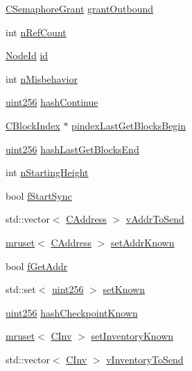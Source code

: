 \begin{DoxyCompactItemize}
\hyperlink{class_c_semaphore_grant}{C\+Semaphore\+Grant} \hyperlink{class_c_node_a4bb25f8bdeeaff5e8cb08abc97bbc44d}{grant\+Outbound}
\item 
int \hyperlink{class_c_node_a01f8cac776bef676651f9b8f3f80ae98}{n\+Ref\+Count}
\item 
\hyperlink{net_8h_a954d746a58632565552615fd0a4ee660}{Node\+Id} \hyperlink{class_c_node_af99591c635f495fc1e6c14745a2a4203}{id}
\item 
int \hyperlink{class_c_node_a442ac1857129bccaea4642d23d94ee58}{n\+Misbehavior}
\item 
\hyperlink{classuint256}{uint256} \hyperlink{class_c_node_a1a1c0d94de0197c5c4abf5a8d13364f3}{hash\+Continue}
\item 
\hyperlink{class_c_block_index}{C\+Block\+Index} $\ast$ \hyperlink{class_c_node_ac655c80f7fbef266417985776043785b}{pindex\+Last\+Get\+Blocks\+Begin}
\item 
\hyperlink{classuint256}{uint256} \hyperlink{class_c_node_a00f1eb04110387df966dd9c3ff3c53fb}{hash\+Last\+Get\+Blocks\+End}
\item 
int \hyperlink{class_c_node_a597b41bd64e2ac9391b7211e65aeb52a}{n\+Starting\+Height}
\item 
bool \hyperlink{class_c_node_a4009c240ccb6d085ae57e8cf4d4c2cb6}{f\+Start\+Sync}
\item 
std\+::vector$<$ \hyperlink{class_c_address}{C\+Address} $>$ \hyperlink{class_c_node_a9b2d9b9182ff111c79f704594c4aa2e1}{v\+Addr\+To\+Send}
\item 
\hyperlink{classmruset}{mruset}$<$ \hyperlink{class_c_address}{C\+Address} $>$ \hyperlink{class_c_node_ac21266ce880bd36b98ba7cfcc447a30f}{set\+Addr\+Known}
\item 
bool \hyperlink{class_c_node_a3da9c559959e182aff8439cd004ff624}{f\+Get\+Addr}
\item 
std\+::set$<$ \hyperlink{classuint256}{uint256} $>$ \hyperlink{class_c_node_ab1b30fa8e48005752f6b0bcf43eca478}{set\+Known}
\item 
\hyperlink{classuint256}{uint256} \hyperlink{class_c_node_af1b7e1316a44a8ed4995413366ed6b8a}{hash\+Checkpoint\+Known}
\item 
\hyperlink{classmruset}{mruset}$<$ \hyperlink{class_c_inv}{C\+Inv} $>$ \hyperlink{class_c_node_ae15aa9a971040800c26bc87b1250220f}{set\+Inventory\+Known}
\item 
std\+::vector$<$ \hyperlink{class_c_inv}{C\+Inv} $>$ \hyperlink{class_c_node_abcd24c9478bc1ab5ba6de6b369080cec}{v\+Inventory\+To\+Send}
\item 

\end{DoxyCompactItemize}
